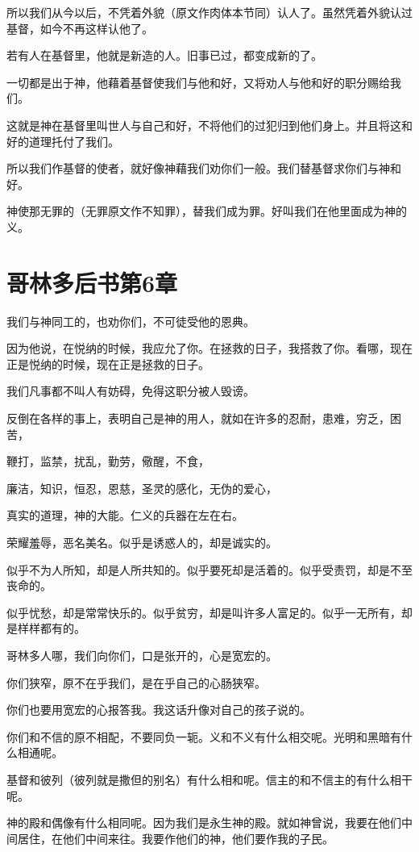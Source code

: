 \documentclass[12pt,oneside]{book}
\begin{document}
所以我们从今以后，不凭着外貌（原文作肉体本节同）认人了。虽然凭着外貌认过基督，如今不再这样认他了。

若有人在基督里，他就是新造的人。旧事已过，都变成新的了。

一切都是出于神，他藉着基督使我们与他和好，又将劝人与他和好的职分赐给我们。

这就是神在基督里叫世人与自己和好，不将他们的过犯归到他们身上。并且将这和好的道理托付了我们。

所以我们作基督的使者，就好像神藉我们劝你们一般。我们替基督求你们与神和好。

神使那无罪的（无罪原文作不知罪），替我们成为罪。好叫我们在他里面成为神的义。

\chapter{哥林多后书第6章}
我们与神同工的，也劝你们，不可徒受他的恩典。

因为他说，在悦纳的时候，我应允了你。在拯救的日子，我搭救了你。看哪，现在正是悦纳的时候，现在正是拯救的日子。

我们凡事都不叫人有妨碍，免得这职分被人毁谤。

反倒在各样的事上，表明自己是神的用人，就如在许多的忍耐，患难，穷乏，困苦，

鞭打，监禁，扰乱，勤劳，儆醒，不食，

廉洁，知识，恒忍，恩慈，圣灵的感化，无伪的爱心，

真实的道理，神的大能。仁义的兵器在左在右。

荣耀羞辱，恶名美名。似乎是诱惑人的，却是诚实的。

似乎不为人所知，却是人所共知的。似乎要死却是活着的。似乎受责罚，却是不至丧命的。

似乎忧愁，却是常常快乐的。似乎贫穷，却是叫许多人富足的。似乎一无所有，却是样样都有的。

哥林多人哪，我们向你们，口是张开的，心是宽宏的。

你们狭窄，原不在乎我们，是在乎自己的心肠狭窄。

你们也要用宽宏的心报答我。我这话升像对自己的孩子说的。

你们和不信的原不相配，不要同负一轭。义和不义有什么相交呢。光明和黑暗有什么相通呢。

基督和彼列（彼列就是撒但的别名）有什么相和呢。信主的和不信主的有什么相干呢。

神的殿和偶像有什么相同呢。因为我们是永生神的殿。就如神曾说，我要在他们中间居住，在他们中间来往。我要作他们的神，他们要作我的子民。
\end{document}

